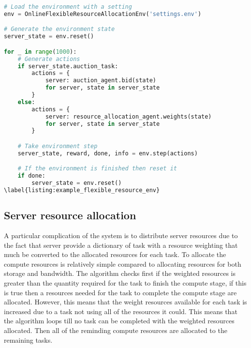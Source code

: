 \begin{lstlisting}[language=Python, frame=single, caption={An example for running the environment},captionpos=b]
# Load the environment with a setting
env = OnlineFlexibleResourceAllocationEnv('settings.env')

# Generate the environment state
server_state = env.reset()

for _ in range(1000):
    # Generate actions
    if server_state.auction_task:
        actions = {
            server: auction_agent.bid(state)
            for server, state in server_state
        }
    else:
        actions = {
            server: resource_allocation_agent.weights(state)
            for server, state in server_state
        }

    # Take environment step
    server_state, reward, done, info = env.step(actions)

    # If the environment is finished then reset it
    if done:
        server_state = env.reset()
\label{listing:example_flexible_resource_env}
\end{lstlisting}

\subsection{Server resource allocation}\label{subsec:server-resource-allocation}
A particular complication of the system is to distribute server resources due to the fact that server provide a
dictionary of task with a resource weighting that much be converted to the allocated resources for each task.
To allocate the compute resources is relatively simple compared to allocating resources for both storage and bandwidth.
The algorithm checks first if the weighted resources is greater than the quantity required for the task to finish the
compute stage, if this is true then a resources needed for the task to complete the compute stage are allocated. However,
this means that the weight resources available for each task is increased due to a task not using all of the resources
it could. This means that the algorithm loops till no task can be completed with the weighted resources allocated.
Then all of the reminding compute resources are allocated to the remaining tasks.

